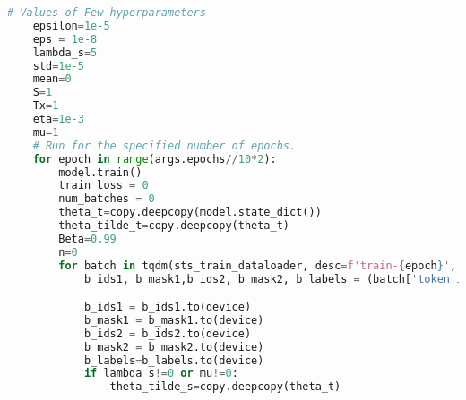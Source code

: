 \begin{lstlisting}[language=Python, caption={Sematic Textual Similarity Training with SMART}, label={lst:sts_SMART}, basicstyle=\ttfamily\small, keywordstyle=\color{blue}, commentstyle=\color{green}, stringstyle=\color{red},linewidth=\textwidth]
    # Values of Few hyperparameters
    epsilon=1e-5
    eps = 1e-8
    lambda_s=5
    std=1e-5
    mean=0
    S=1
    Tx=1
    eta=1e-3
    mu=1
    # Run for the specified number of epochs.
    for epoch in range(args.epochs//10*2):
        model.train()
        train_loss = 0
        num_batches = 0
        theta_t=copy.deepcopy(model.state_dict())
        theta_tilde_t=copy.deepcopy(theta_t)
        Beta=0.99
        n=0
        for batch in tqdm(sts_train_dataloader, desc=f'train-{epoch}', disable=TQDM_DISABLE):
            b_ids1, b_mask1,b_ids2, b_mask2, b_labels = (batch['token_ids_1'], batch['attention_mask_1'],batch['token_ids_2'],batch['attention_mask_2'],batch['labels'])

            b_ids1 = b_ids1.to(device)
            b_mask1 = b_mask1.to(device)
            b_ids2 = b_ids2.to(device)
            b_mask2 = b_mask2.to(device)
            b_labels=b_labels.to(device)
            if lambda_s!=0 or mu!=0:
                theta_tilde_s=copy.deepcopy(theta_t)


\end{lstlisting}
